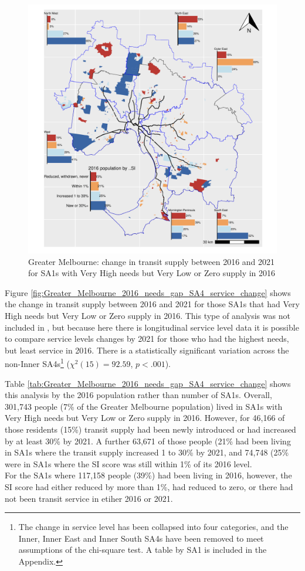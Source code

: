 \documentclass[preprint, 3p,
authoryear]{elsarticle} %
\begin{document}
\begin{figure}
\centering
\includegraphics{ReynoldsCurrieQu2024_files/figure-latex/Greater_Melbourne_2016_needs_gap_SA4_service_change-1.pdf}
\caption{Greater Melbourne: change in transit supply between 2016 and
2021 for SA1s with Very High needs but Very Low or Zero supply in 2016}
\end{figure}

Figure \ref{fig:Greater_Melbourne_2016_needs_gap_SA4_service_change}
shows the change in transit supply between 2016 and 2021 for those SA1s
that had Very High needs but Very Low or Zero supply in 2016. This type
of analysis was not included in \citet{currie2010identifying}, but
because here there is longitudinal service level data it is possible to
compare service levels changes by 2021 for those who had the highest
needs, but least service in 2016. There is a statistically significant
variation across the non-Inner SA4s\footnote{The change in service level
  has been collapsed into four categories, and the Inner, Inner East and
  Inner South SA4s have been removed to meet assumptions of the
  chi-square test. A table by SA1 is included in the Appendix.}
(\(\chi^2(15) = 92.59\), \(p < .001\)).

Table \ref{tab:Greater_Melbourne_2016_needs_gap_SA4_service_change}
shows this analysis by the 2016 population rather than number of SA1s.
Overall, 301,743 people (7\% of the Greater Melbourne population) lived
in SA1s with Very High needs but Very Low or Zero supply in 2016.
However, for 46,166 of those residents (15\%) transit supply had been
newly introduced or had increased by at least 30\% by 2021. A further
63,671 of those people (21\% had been living in SA1s where the transit
supply increased 1 to 30\% by 2021, and 74,748 (25\% were in SA1s where
the SI score was still within 1\% of its 2016 level.\\
For the SA1s where 117,158 people (39\%) had been living in 2016,
however, the SI score had either reduced by more than 1\%, had reduced
to zero, or there had not been transit service in etiher 2016 or 2021.
\end{document}
